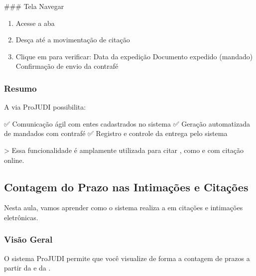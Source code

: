 \documentclass[letterpaper,10pt,brazil]{sphinxmanual}
\begin{document}
\sphinxAtStartPar
\#\#\# Tela Navegar
\begin{enumerate}
%
\item {} 
\sphinxAtStartPar
Acesse a aba 

\item {} 
\sphinxAtStartPar
Desça até a movimentação de citação

\item {} 
\sphinxAtStartPar
Clique em  para verificar:
\sphinxhyphen{} Data da expedição
\sphinxhyphen{} Documento expedido (mandado)
\sphinxhyphen{} Confirmação de envio da contrafé

\end{enumerate}


\subsubsection{Resumo}
\label{\detokenize{projud_30_cita_xe7_xe3oeletronica:resumo}}
\sphinxAtStartPar
A  via ProJUDI possibilita:

\sphinxAtStartPar
✅ Comunicação ágil com entes cadastrados no sistema
✅ Geração automatizada de mandados com contrafé
✅ Registro e controle da entrega pelo sistema

\sphinxAtStartPar
\textgreater{} Essa funcionalidade é amplamente utilizada para citar , como  e  com citação online.

\sphinxstepscope


\subsection{Contagem do Prazo nas Intimações e Citações}
\label{\detokenize{projud_31_contagemprazo:contagem-do-prazo-nas-intimacoes-e-citacoes}}\label{\detokenize{projud_31_contagemprazo::doc}}
\sphinxAtStartPar
Nesta aula, vamos aprender como o sistema  realiza a  em citações e intimações eletrônicas.


\subsubsection{Visão Geral}
\label{\detokenize{projud_31_contagemprazo:visao-geral}}
\sphinxAtStartPar
O sistema ProJUDI permite que você visualize de forma  a contagem de prazos a partir da  e da .
\end{document}
